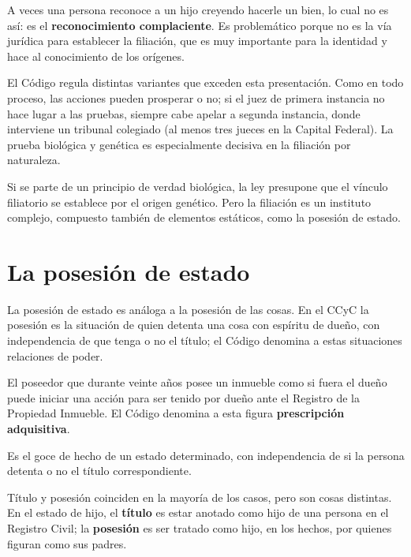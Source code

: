 \documentclass[12pt,oneside]{book}
\begin{document}
\begin{importante}
A veces una persona reconoce a un hijo creyendo hacerle un bien, lo cual no es así: es el \textbf{reconocimiento complaciente}. Es problemático porque no es la vía jurídica para establecer la filiación, que es muy importante para la identidad y hace al conocimiento de los orígenes.
\end{importante}

El Código regula distintas variantes que exceden esta presentación. Como en todo proceso, las acciones pueden prosperar o no; si el juez de primera instancia no hace lugar a las pruebas, siempre cabe apelar a segunda instancia, donde interviene un tribunal colegiado (al menos tres jueces en la Capital Federal). La prueba biológica y genética es especialmente decisiva en la filiación por naturaleza.

\begin{importante}
Si se parte de un principio de verdad biológica, la ley presupone que el vínculo filiatorio se establece por el origen genético. Pero la filiación es un instituto complejo, compuesto también de elementos estáticos, como la posesión de estado.
\end{importante}

\section{La posesión de estado}

La posesión de estado es análoga a la posesión de las cosas. En el CCyC la posesión es la situación de quien detenta una cosa con espíritu de dueño, con independencia de que tenga o no el título; el Código denomina a estas situaciones relaciones de poder.

\begin{ejemplo}
El poseedor que durante veinte años posee un inmueble como si fuera el dueño puede iniciar una acción para ser tenido por dueño ante el Registro de la Propiedad Inmueble. El Código denomina a esta figura \textbf{prescripción adquisitiva}.
\end{ejemplo}

\begin{definicion}
Es el goce de hecho de un estado determinado, con independencia de si la persona detenta o no el título correspondiente.
\end{definicion}

\begin{importante}
Título y posesión coinciden en la mayoría de los casos, pero son cosas distintas. En el estado de hijo, el \textbf{título} es estar anotado como hijo de una persona en el Registro Civil; la \textbf{posesión} es ser tratado como hijo, en los hechos, por quienes figuran como sus padres.
\end{importante}
\end{document}
